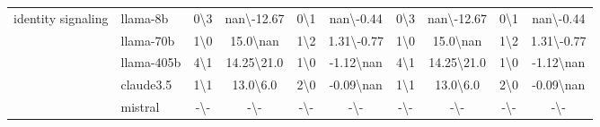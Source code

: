 \begin{table*}[ht!]
\begin{sc}
\begin{tabular}{l|l|cc|cc|cc|cc}
\midrule
\multirow{5}{*}{\parbox{1.8cm}{identity signaling}} & llama-8b & 0\textbackslash3 & nan\textbackslash-12.67 & 0\textbackslash1 & nan\textbackslash-0.44 & 0\textbackslash3 & nan\textbackslash-12.67 & 0\textbackslash1 & nan\textbackslash-0.44\\
 & llama-70b & 1\textbackslash0 & 15.0\textbackslash nan & 1\textbackslash2 & 1.31\textbackslash-0.77 & 1\textbackslash0 & 15.0\textbackslash nan & 1\textbackslash2 & 1.31\textbackslash-0.77\\
 & llama-405b & 4\textbackslash1 & 14.25\textbackslash21.0 & 1\textbackslash0 & -1.12\textbackslash nan & 4\textbackslash1 & 14.25\textbackslash21.0 & 1\textbackslash0 & -1.12\textbackslash nan\\
 & claude3.5 & 1\textbackslash1 & 13.0\textbackslash6.0 & 2\textbackslash0 & -0.09\textbackslash nan & 1\textbackslash1 & 13.0\textbackslash6.0 & 2\textbackslash0 & -0.09\textbackslash nan\\
 & mistral & -\textbackslash- & -\textbackslash- & -\textbackslash- & -\textbackslash- & -\textbackslash- & -\textbackslash- & -\textbackslash- & -\textbackslash-\\
\bottomrule
\end{tabular}
\end{sc}
\end{table*}
